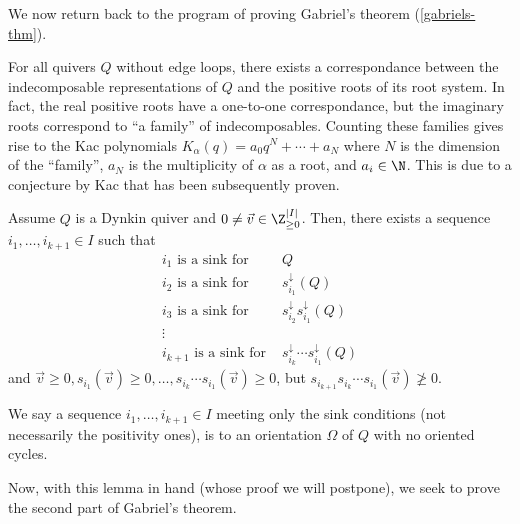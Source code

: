 \documentclass[11pt,leqno,oneside]{amsbook}
\numberwithin{thm}{section}
\renewcommand{\Q}{Q} %
\newcommand{\sinktosource}{s^\downarrow} %
\begin{document}
We now return back to the program of proving Gabriel's theorem
(\ref{gabriels-thm}).
\begin{rmk}
  For all quivers \(\Q\) without edge loops, there exists a
  correspondance between the indecomposable representations of \(\Q\)
  and the positive roots of its root system. In fact, the real
  positive roots have a one-to-one correspondance, but the imaginary
  roots correspond to ``a family'' of indecomposables. Counting these
  families gives rise to the Kac polynomials \(K_\alpha(q) = a_0 q^N +
  \cdots + a_N\) where \(N\) is the dimension of the ``family'',
  \(a_N\) is the multiplicity of \(\alpha\) as a root, and \(a_i \in
  \N\). This is due to a conjecture by Kac that has been subsequently proven.
\end{rmk}
\begin{lem}\label{lemma-star}
  Assume \(\Q\) is a Dynkin quiver and \(0 \neq \vec{v} \in
  \Z^{|I|}_{\geq 0}\). Then, there exists a sequence \(i_1, \ldots,
  i_{k+1} \in I\) such that
  \begin{align*}
    i_1 \text{ is a sink for } & \Q \\
    i_2 \text{ is a sink for } & \sinktosource_{i_1}(\Q) \\
    i_3 \text{ is a sink for } & \sinktosource_{i_2}
                                 \sinktosource_{i_1}(\Q) \\
    \vdots & \\
    i_{k+1} \text{ is a sink for } & \sinktosource_{i_k} \cdots
                                     \sinktosource_{i_1}(\Q) 
  \end{align*}
  and \(\vec{v} \geq 0, s_{i_1}(\vec{v}) \geq 0, \ldots, s_{i_k}
  \cdots s_{i_1}(\vec{v}) \geq 0\), but \(s_{i_{k+1}} s_{i_k} \cdots
  s_{i_1}(\vec{v}) \not \geq 0\).
\end{lem}
\begin{defn}\label{defn-adapted}
  We say a sequence \(i_1, \ldots, i_{k+1} \in I\) meeting only the
  sink conditions (not necessarily the positivity ones), is
   to an orientation \(\Omega\) of \(\Q\) with no oriented
  cycles. 
\end{defn}
Now, with this lemma in hand (whose proof we will postpone), we seek
to prove the second part of Gabriel's theorem.
\end{document}
